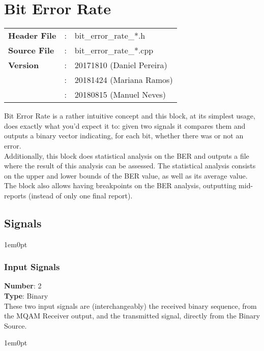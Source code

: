 \clearpage

\newenvironment{subs}
  {\begin{adjustwidth}{1em}{0pt}
  \nointerlineskip\leavevmode}
  {\end{adjustwidth}}


\section{Bit Error Rate}
\label{sec:bit_error_rate}
\begin{refsection}

\begin{tcolorbox}	
\begin{tabular}{p{2.75cm} p{0.2cm} p{10.5cm}} 	
\textbf{Header File}    &:& bit\_error\_rate\_*.h \\
\textbf{Source File}    &:& bit\_error\_rate\_*.cpp \\
\textbf{Version}        &:& 20171810 (Daniel Pereira)\\
                        &:& 20181424 (Mariana Ramos) \\
                        &:& 20180815 (Manuel Neves)\\
\end{tabular}
\end{tcolorbox}
Bit Error Rate is a rather intuitive concept and this block, at its simplest usage, does exactly what you'd expect it to: given two signals it compares them and outputs a binary vector indicating, for each bit, whether there was or not an error.\\
Additionally, this block does statistical analysis on the BER and outputs a file where the result of this analysis can be assessed.
The statistical analysis consists on the upper and lower bounds of the BER value, as well as its average value.\\
The block also allows having breakpoints on the BER analysis, outputting mid-reports (instead of only one final report).

\subsection*{Signals}
\begin{subs}
\subsubsection*{Input Signals}
\end{subs}
\hspace*{0.5in}\textbf{Number}: 2\\
\hspace*{0.5in}\textbf{Type}: Binary
\\
These two input signals are (interchangeably) the received binary sequence, from the MQAM Receiver output, and the transmitted signal, directly from the Binary Source.
\begin{subs}

\end{subs}
\end{refsection}
